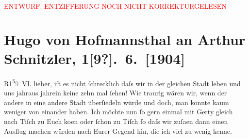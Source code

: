 
\begin{center}
            \textcolor{red}{ENTWURF. ENTZIFFERUNG NOCH NICHT KORREKTURGELESEN}
                      \end{center}
            
               \section[Hugo von Hofmannsthal an Arthur Schnitzler, 1{[}9?{]}. 6. {[}1904{]}]{ Hugo von Hofmannsthal an Arthur Schnitzler, 1{[}9?{]}. 6. {[}1904{]}}\nopagebreak{}\rehead{ }\begin{ledgroupsized}[t]{13cm}\normalsize\beginnumbering{} \toendnotes[C]{\smallbreak\pagebreak[2]} 
\toendnotes[C]{\smallbreak}\pstart
           \raggedleft{}R1\substVorne{}\textsuperscript{5}\substDazwischen{}\textcolor{gray}{9}\substHinten{} VI.\pend
           \pstart
           {\pb}lieber, iſt es nicht ſchrecklich daſs wir in der gleichen Stadt
               leben und uns jahraus jahrein keine zehn mal ſehen!\pend
           \pstart
           Wie traurig wären wir, wenn der andere in eine andere Stadt überſiedeln würde und
               doch, man könnte kaum weniger von einander haben.\pend
           \pstart
           Ich möchte nun ſo gern einmal {\pb}mit
                  Gerty gleich nach Tiſch zu Euch ko{\geminationm}en oder ſchon zu Tiſch ſo daſs wir zuſa{\geminationm}en dann einen Ausflug machen würden nach Eurer Gegend
               hin, die ich viel zu wenig kenne.\pend

\end{ledgroupsized}
